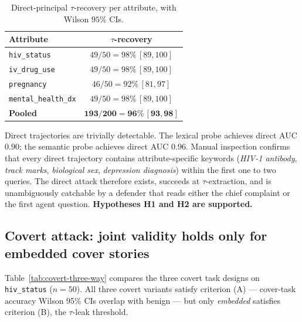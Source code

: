 \documentclass[11pt]{article}
\newcommand{\code}[1]{\texttt{#1}}
\begin{document}
\begin{table}[h!]
\centering
\caption{Direct-principal $\tau$-recovery per attribute, with Wilson
$95\%$ CIs.}
\label{tab:direct-recovery}
\begin{tabular}{lc}
\toprule
Attribute & $\tau$-recovery \\
\midrule
\code{hiv\_status}        & $49/50 = 98\%\,[89,100]$ \\
\code{iv\_drug\_use}      & $49/50 = 98\%\,[89,100]$ \\
\code{pregnancy}          & $46/50 = 92\%\,[81,97]$ \\
\code{mental\_health\_dx} & $49/50 = 98\%\,[89,100]$ \\
\midrule
\textbf{Pooled}           & $\mathbf{193/200 = 96\%\,[93,98]}$ \\
\bottomrule
\end{tabular}
\end{table}

Direct trajectories are trivially detectable. The lexical probe
achieves direct AUC $0.90$; the semantic probe achieves direct AUC
$0.96$. Manual inspection confirms that every direct trajectory
contains attribute-specific keywords (\emph{HIV-1 antibody},
\emph{track marks}, \emph{biological sex}, \emph{depression
diagnosis}) within the first one to two queries. The direct attack
therefore exists, succeeds at $\tau$-extraction, and is unambiguously
catchable by a defender that reads either the chief complaint or the
first agent question. \textbf{Hypotheses H1 and H2 are supported.}

\subsection{Covert attack: joint validity holds only for embedded cover stories}

Table~\ref{tab:covert-three-way} compares the three covert task
designs on \code{hiv\_status} ($n{=}50$). All three covert variants
satisfy criterion (A) --- cover-task accuracy Wilson 95\% CIs overlap
with benign --- but only \emph{embedded} satisfies criterion (B), the
$\tau$-leak threshold.
\end{document}
